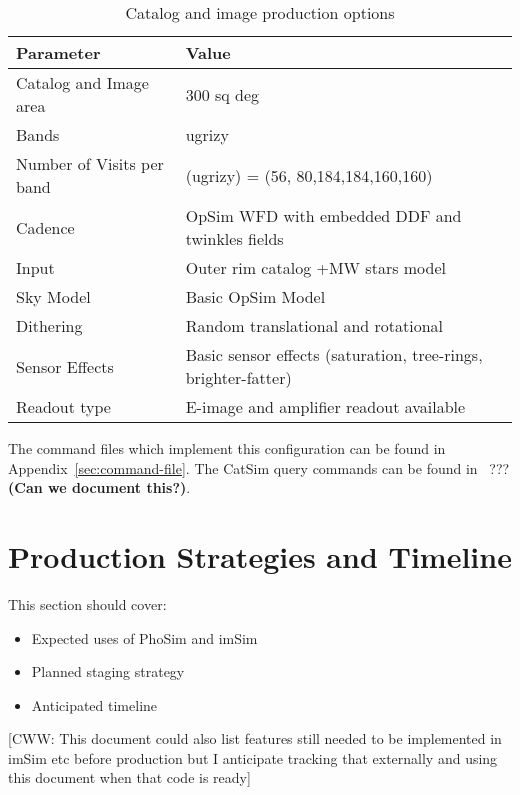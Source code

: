 \documentclass[12pt,letterpaper]{article}
\begin{document}
\begin{table}[!htb]
  \centering
  \begin{tabular}{| l| l| }
    \hline 
    Parameter                       & Value   \\
    \hline
    Catalog and Image area  & 300 sq deg \\
    Bands                             & ugrizy   \\
    Number of Visits per band  &  (ugrizy) = (56, 80,184,184,160,160) \\
    Cadence                         & OpSim WFD with embedded DDF and twinkles fields\\
    Input                              & Outer rim catalog +MW stars model \\
    Sky Model                      & Basic OpSim Model \\
    Dithering                       & Random translational and rotational  \\
    Sensor Effects                & Basic sensor effects (saturation, tree-rings, brighter-fatter) \\
    Readout type                 & E-image and amplifier readout available \\
    \hline
  \end{tabular}
  \caption{Catalog and image production options}
  \label{tab:image-options}
\end{table}

The command files which implement this configuration can be found in
Appendix~\ref{sec:command-file}.  The CatSim query commands can be
found in~ ??? {\bf (Can we document this?)}.

\section{Production Strategies and Timeline}

This section should cover:

\begin{itemize}
\item Expected uses of PhoSim and imSim
\item Planned staging strategy
\item Anticipated timeline
\end{itemize}

[CWW: This document could also list features still needed to be implemented
in imSim etc before production but I anticipate tracking that
externally and using this document when that code is ready]
\end{document}
